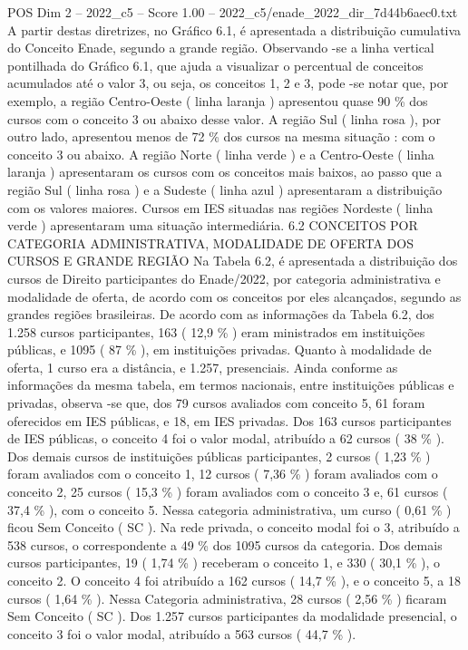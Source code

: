 \begin{textsample}{POS Dim 2 – 2022\_c5 – Score 1.00 – 2022\_c5/enade\_2022\_dir\_7d44b6aec0.txt}
A partir destas diretrizes, no Gráfico 6.1, é apresentada a distribuição cumulativa do Conceito Enade, segundo a grande região.
Observando -se a linha vertical pontilhada do Gráfico 6.1, que ajuda a visualizar o percentual de conceitos acumulados até o valor 3, ou seja, os conceitos 1, 2 e 3, pode -se notar que, por exemplo, a região Centro-Oeste ( linha laranja ) apresentou quase 90 \% dos cursos com o conceito 3 ou abaixo desse valor.
A região Sul ( linha rosa ), por outro lado, apresentou menos de 72 \% dos cursos na mesma situação : com o conceito 3 ou abaixo.
A região Norte ( linha verde ) e a Centro-Oeste ( linha laranja ) apresentaram os cursos com os conceitos mais baixos, ao passo que a região Sul ( linha rosa ) e a Sudeste ( linha azul ) apresentaram a distribuição com os valores maiores.
Cursos em IES situadas nas regiões Nordeste ( linha verde ) apresentaram uma situação intermediária. 6.2 CONCEITOS POR CATEGORIA ADMINISTRATIVA, MODALIDADE DE OFERTA DOS CURSOS E GRANDE REGIÃO Na Tabela 6.2, é apresentada a distribuição dos cursos de Direito participantes do Enade/2022, por categoria administrativa e modalidade de oferta, de acordo com os conceitos por eles alcançados, segundo as grandes regiões brasileiras.
De acordo com as informações da Tabela 6.2, dos 1.258 cursos participantes, 163 ( 12,9 \% ) eram ministrados em instituições públicas, e 1095 ( 87 \% ), em instituições privadas.
Quanto à modalidade de oferta, 1 curso era a distância, e 1.257, presenciais.
Ainda conforme as informações da mesma tabela, em termos nacionais, entre instituições públicas e privadas, observa -se que, dos 79 cursos avaliados com conceito 5, 61 foram oferecidos em IES públicas, e 18, em IES privadas.
Dos 163 cursos participantes de IES públicas, o conceito 4 foi o valor modal, atribuído a 62 cursos ( 38 \% ).
Dos demais cursos de instituições públicas participantes, 2 cursos ( 1,23 \% ) foram avaliados com o conceito 1, 12 cursos ( 7,36 \% ) foram avaliados com o conceito 2, 25 cursos ( 15,3 \% ) foram avaliados com o conceito 3 e, 61 cursos ( 37,4 \% ), com o conceito 5.
Nessa categoria administrativa, um curso ( 0,61 \% ) ficou Sem Conceito ( SC ).
Na rede privada, o conceito modal foi o 3, atribuído a 538 cursos, o correspondente a 49 \% dos 1095 cursos da categoria.
Dos demais cursos participantes, 19 ( 1,74 \% ) receberam o conceito 1, e 330 ( 30,1 \% ), o conceito 2.
O conceito 4 foi atribuído a 162 cursos ( 14,7 \% ), e o conceito 5, a 18 cursos ( 1,64 \% ).
Nessa Categoria administrativa, 28 cursos ( 2,56 \% ) ficaram Sem Conceito ( SC ).
Dos 1.257 cursos participantes da modalidade presencial, o conceito 3 foi o valor modal, atribuído a 563 cursos ( 44,7 \% ).

\end{textsample}
